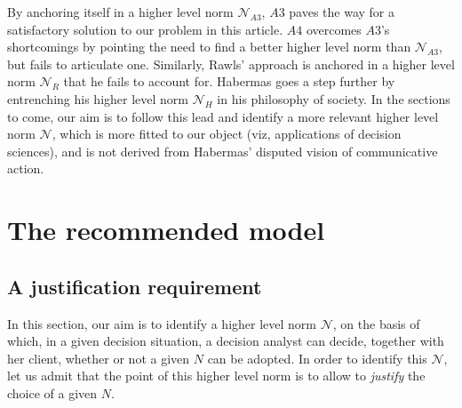\documentclass[preprint, french, english, 11pt, authoryear]{elsarticle}%
\newcommand{\adv}{\mathscr{N}}
\begin{document}
By anchoring itself in a higher level norm $\mathscr{N}_{A3}$, $A3$ paves the way for a satisfactory solution to our problem in this article. $A4$ overcomes $A3$'s shortcomings by pointing the need to find a better higher level norm than $\mathscr{N}_{A3}$, but fails to articulate one. Similarly, Rawls' approach is anchored in a higher level norm $\mathscr{N}_{R}$ that he fails to account for. Habermas goes a step further by entrenching his higher level norm $\mathscr{N}_{H}$ in his philosophy of society. In the sections to come, our aim is to follow this lead and identify a more relevant higher level norm $\adv$, which is more fitted to our object (viz, applications of decision sciences), and is not derived from Habermas' disputed vision of communicative action.

\section{The recommended model}
\subsection{A justification requirement}
In this section, our aim is to identify a higher level norm $\adv$, on the basis of which, in a given decision situation, a decision analyst can decide, together with her client, whether or not a given $N$ can be adopted. In order to identify this $\adv$, let us admit that the point of this higher level norm is to allow to \emph{justify} the choice of a given $N$.
\end{document}
